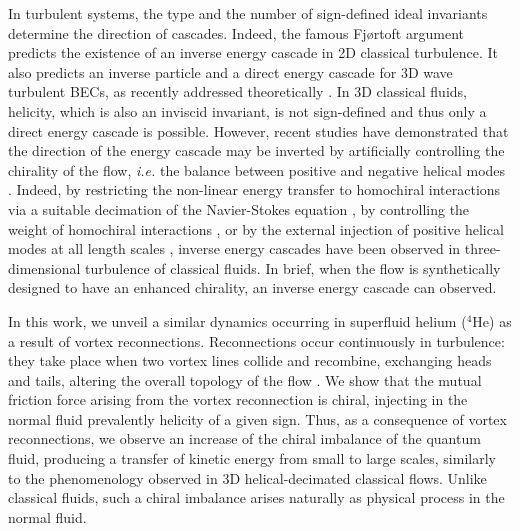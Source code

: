 \documentclass[%
 reprint,
 amsmath,amssymb,
 aps,
 prl,
]{revtex4-2}
\begin{document}
{In turbulent systems, the type and the number of sign-defined ideal invariants determine the direction of cascades. Indeed, the famous 
Fjørtoft argument \cite{fjortoft1953changes} predicts 
the existence of an inverse energy cascade
in 2D classical turbulence. 
It also predicts an inverse particle and a direct energy cascade 
for 3D wave turbulent BECs, as recently addressed theoretically \cite{Zhu_DirectInverseCascades_2023}. In 3D classical fluids, helicity, which is also an inviscid invariant, is not sign-defined and thus only a direct energy cascade is possible. However, recent studies have demonstrated that the direction of the energy 
cascade may be inverted by artificially controlling the chirality of the 
flow, \textit{i.e.} the balance between positive and negative helical 
modes \cite{moffatt1969}.
Indeed, by restricting the non-linear energy transfer to homochiral 
interactions via a suitable decimation of the Navier-Stokes equation 
\cite{biferaleInverseEnergyCascade2012a,biferale-etal-2013}, by
controlling the weight of homochiral interactions \cite{sahoo-etal-2017},
or by the external injection 
of positive helical modes at all length scales 
\cite{plunianInverseCascadeEnergy2020a}, inverse energy cascades 
have been observed in three-dimensional turbulence of classical fluids. 
In brief, when the flow is synthetically designed to have an 
enhanced chirality, an inverse energy cascade can observed.


In this work, we unveil a similar dynamics occurring in superfluid helium
($^4$He) as a result of vortex reconnections.  
Reconnections occur continuously in turbulence: they take place when
two vortex lines collide and recombine, exchanging heads and tails, 
altering the overall topology of the flow
\cite{koplik-levine-1993,bewley-etal-2008,rorai-etal-2016,serafini-etal-2017,galantucci-baggaley-parker-barenghi-2019,villoisUniversalNonuniversalAspects2017,villois2020irreversible}. 
We show that the mutual friction force arising from the  
vortex reconnection is chiral, injecting in the normal fluid prevalently 
helicity of a given sign. Thus, as a consequence of vortex reconnections,
we observe an increase of the chiral imbalance of the quantum fluid, producing a transfer of kinetic energy from small to large scales, similarly to the phenomenology observed in 3D helical-decimated classical flows. 
 Unlike classical fluids, such a chiral imbalance arises naturally as physical process in the normal fluid.%

}
\end{document}
